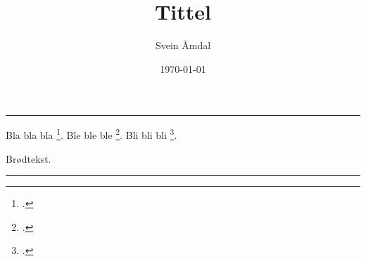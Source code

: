 \documentclass[12pt, a4paper, norsk]{article}
\title{\huge{Tittel}}
\author{Svein Åmdal}
\date{\today}
\begin{document}
\maketitle
\hrule
\vspace{1cm}


Bla bla bla \footcite[20]{Ødegård}. Ble ble ble \footcite[27--30]{Ødegård}. Bli bli bli \footcite[4]{Wiesner-Hanks}.


% 

Brødtekst.



\vspace{1cm}
\hrule
\printbibliography[title=Litteratur]
\end{document}
